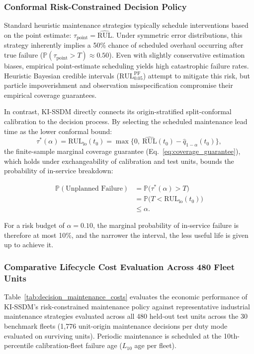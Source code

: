 \documentclass[a4paper,fleqn]{cas-dc}
\begin{document}
\subsubsection{Conformal Risk-Constrained Decision Policy}
Standard heuristic maintenance strategies typically schedule interventions based on the point estimate: $\tau_{\mathrm{point}} = \widehat{\mathrm{RUL}}$. Under symmetric error distributions, this strategy inherently implies a 50\% chance of scheduled overhaul occurring after true failure ($\mathbb{P}(\tau_{\mathrm{point}} > T) \approx 0.50$). Even with slightly conservative estimation biases, empirical point-estimate scheduling yields high catastrophic failure rates. Heuristic Bayesian credible intervals ($\mathrm{RUL}_{0.05}^{\mathrm{PF}}$) attempt to mitigate this risk, but particle impoverishment and observation misspecification compromise their empirical coverage guarantees.

In contrast, KI-SSDM directly connects its origin-stratified split-conformal calibration to the decision process. By selecting the scheduled maintenance lead time as the lower conformal bound:
\begin{equation}
    \tau^*(\alpha) = \mathrm{RUL}_{\mathrm{lo}}(t_0) = \max\bigl\{0,\ \widehat{\mathrm{RUL}}(t_0) - \hat{q}_{1-\alpha}(t_0)\bigr\},
    \label{eq:conformal_lead_time}
\end{equation}
the finite-sample marginal coverage guarantee (Eq.~\eqref{eq:coverage_guarantee}), which holds under exchangeability of calibration and test units, bounds the probability of in-service breakdown:

\begin{equation}
\label{eq:conformal_risk_bound}
\begin{aligned}
\mathbb{P}(\text{Unplanned Failure})
&= \mathbb{P}\bigl(\tau^*(\alpha)>T\bigr)\\
&= \mathbb{P}\bigl(
T<\mathrm{RUL}_{\mathrm{lo}}(t_0)
\bigr)\\
&\leq \alpha.
\end{aligned}
\end{equation}

For a risk budget of $\alpha = 0.10$, the marginal probability of in-service failure is therefore at most 10\%, and the narrower the interval, the less useful life is given up to achieve it.

\subsubsection{Comparative Lifecycle Cost Evaluation Across 480 Fleet Units}
Table~\ref{tab:decision_maintenance_costs} evaluates the economic performance of KI-SSDM's risk-constrained maintenance policy against representative industrial maintenance strategies evaluated across all 480 held-out test units across the 30 benchmark fleets (1,776 unit-origin maintenance decisions per duty mode evaluated on surviving units). Periodic maintenance is scheduled at the 10th-percentile calibration-fleet failure age ($L_{10}$ age per fleet).
\end{document}
